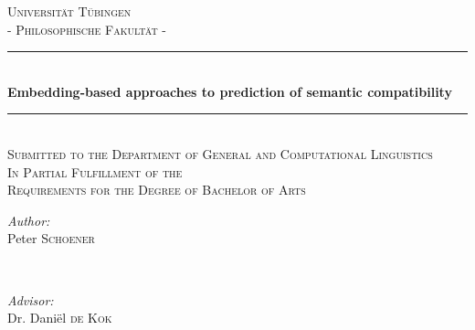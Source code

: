 \documentclass[a4paper, 12pt]{scrartcl}
\begin{document}
\begin{titlepage}

\newcommand{\HRule}{\rule{\linewidth}{0.5mm}} %

\center %
 

\textsc{\LARGE Universität Tübingen}\\ %
\textsc{\Large - Philosophische Fakultät -}\\[1.5cm]



\HRule \\[0.4cm]
{ \huge \bfseries Embedding-based approaches to prediction of semantic compatibility}\\[0.4cm] %
\HRule \\[1.0cm]
\textsc{\Large Submitted to the Department of General and Computational Linguistics }\\
\textsc{\Large In Partial Fulfillment of the  }\\
\textsc{\Large Requirements for the }
\textsc{\Large Degree of Bachelor of Arts  }\\[0.5cm]

\begin{minipage}{0.4\textwidth}
\begin{flushleft} \large
\emph{Author:}\\
Peter \textsc{Schoener} %
\end{flushleft}
\end{minipage}
~
\begin{minipage}{0.4\textwidth}
\begin{flushright} \large
\emph{Advisor:} \\
Dr. Dani\"el \textsc{de Kok} %
\end{flushright}
\end{minipage}\\[2cm]


\end{titlepage}
\end{document}
